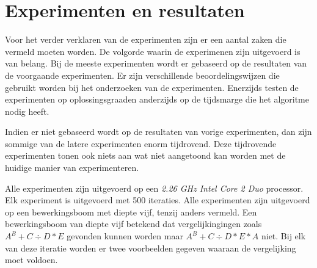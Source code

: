 \documentclass[Main.tex]{subfiles}
\begin{document}
\section{Experimenten en resultaten}
Voor het verder verklaren van de experimenten zijn er een aantal zaken die vermeld moeten worden. De volgorde waarin de experimenen zijn uitgevoerd is van belang. Bij de meeste experimenten wordt er gebaseerd op de resultaten van de voorgaande experimenten. Er zijn verschillende beoordelingswijzen die gebruikt worden bij het onderzoeken van de experimenten. Enerzijds testen de experimenten op oplossingsgraad\footnotemark[\ref{note:oplossingsgraad}] en anderzijds op de tijdsmarge die het algoritme nodig heeft. 
\par
Indien er niet gebaseerd wordt op de resultaten van vorige experimenten, dan zijn sommige van de latere experimenten enorm tijdrovend. Deze tijdrovende experimenten tonen ook niets aan wat niet aangetoond kan worden met de huidige manier van experimenteren.
\par
Alle experimenten zijn uitgevoerd op een \textit{2.26 GHz Intel Core 2 Duo} processor. Elk experiment is uitgevoerd met 500 iteraties. Alle experimenten zijn uitgevoerd op een bewerkingsboom met diepte vijf, tenzij anders vermeld. Een bewerkingsboom van diepte vijf betekend dat vergelijkingingen zoals $A^{B}+C \div D \ast E$ gevonden kunnen worden maar $A^{B}+C \div D \ast E \ast A$ niet. Bij elk van deze iteratie worden er twee voorbeelden gegeven waaraan de vergelijking moet voldoen.
\end{document}
